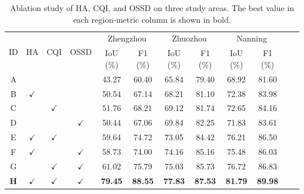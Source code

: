 \begingroup
\begin{table}[H]
\centering
\comparisonfont
\captionsetup{name=Table,font=comparisoncaption,labelfont=bf,labelsep=newline,justification=raggedright,singlelinecheck=false}
\caption{Ablation study of HA, CQI, and OSSD on three study areas. The best value in each region-metric column is shown in bold.}
\label{tab:ablation_modules}
\fontsize{8}{10}\selectfont
\setlength{\tabcolsep}{3pt}
\renewcommand{\arraystretch}{1.12}
\begin{tabular*}{\linewidth}{@{\extracolsep{\fill}}c ccc cccc cccc@{}}
\toprule
\multirow{2}{*}{ID} & \multirow{2}{*}{HA} & \multirow{2}{*}{CQI} & \multirow{2}{*}{OSSD} & \multicolumn{2}{c}{Zhengzhou} & \multicolumn{2}{c}{Zhuozhou} & \multicolumn{2}{c}{Nanning} \\
\cmidrule(lr){5-6} \cmidrule(lr){7-8} \cmidrule(lr){9-10}
 & & & & IoU (\%) & F1 (\%) & IoU (\%) & F1 (\%) & IoU (\%) & F1 (\%) \\
\midrule
A & & & & 43.27 & 60.40 & 65.84 & 79.40 & 68.92 & 81.60 \\
B & \(\checkmark\) & & & 50.54 & 67.14 & 68.21 & 81.10 & 72.38 & 83.98 \\
C & & \(\checkmark\) & & 51.76 & 68.21 & 69.12 & 81.74 & 72.65 & 84.16 \\
D & & & \(\checkmark\) & 50.44 & 67.06 & 69.84 & 82.25 & 71.83 & 83.61 \\
E & \(\checkmark\) & \(\checkmark\) & & 59.64 & 74.72 & 73.05 & 84.42 & 76.21 & 86.50 \\
F & \(\checkmark\) & & \(\checkmark\) & 58.73 & 74.00 & 74.16 & 85.16 & 75.48 & 86.03 \\
G & & \(\checkmark\) & \(\checkmark\) & 61.02 & 75.79 & 75.03 & 85.73 & 76.72 & 86.83 \\
\textbf{H} & \textbf{\(\checkmark\)} & \textbf{\(\checkmark\)} & \textbf{\(\checkmark\)} & \textbf{79.45} & \textbf{88.55} & \textbf{77.83} & \textbf{87.53} & \textbf{81.79} & \textbf{89.98} \\
\bottomrule
\end{tabular*}
\end{table}
\endgroup
